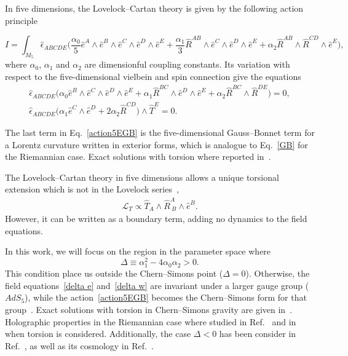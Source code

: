 \documentclass[aps,prd,12pt,superscriptaddress,showpacs,showkeys,longbibliography,reprint,nofootinbib]{revtex4-1}
\begin{document}
In five dimensions, the Lovelock--Cartan theory is given by the following action principle 
\begin{widetext}
  \begin{equation}
    \label{action5EGB}
    I = \int_{M_5} \hat{\epsilon}_{ABCDE} \Big(\frac{\alpha_0}{5}\hat{e}^A\wedge\hat{e}^B\wedge\hat{e}^C\wedge
    \hat{e}^D\wedge\hat{e}^E
    +\frac{\alpha_1}{3}\hat{R}^{AB}\wedge\hat{e}^C\wedge\hat{e}^D\wedge\hat{e}^E
    +\alpha_2\hat{R}^{AB}\wedge\hat{R}^{CD}
    \wedge\hat{e}^E\Big),
  \end{equation}
  where $\alpha_0$, $\alpha_1$ and $\alpha_2$ are dimensionful coupling constants. Its variation with respect to the five-dimensional vielbein and spin connection give the equations
  \begin{gather}
    \label{delta e}
    \hat{\epsilon}_{ABCDE}\Big(\alpha_0\hat{e}^B\wedge\hat{e}^C\wedge\hat{e}^D\wedge\hat{e}^E
    + \alpha_1\hat{R}^{BC}\wedge\hat{e}^D\wedge\hat{e}^E
    + \alpha_2\hat{R}^{BC}\wedge\hat{R}^{DE}\Big)=0,
    \\
    \label{delta w}
    \hat{\epsilon}_{ABCDE}\Big(\alpha_1\hat{e}^C\wedge\hat{e}^D+
    2\alpha_2\hat{R}^{CD}\Big)\wedge\hat{T}^E=0.
  \end{gather}
\end{widetext}

The last term in Eq.~\eqref{action5EGB} is the five-dimensional Gauss--Bonnet term for a Lorentz curvature written in exterior forms, which is analogue to Eq.~\eqref{GB} for the Riemannian case.
Exact solutions with torsion where reported in~\cite{Canfora:2007ux}.

The Lovelock--Cartan theory in five dimensions allows a unique torsional extension which is not in the Lovelock series~\cite{Mardones:1990qc},
\begin{align}
  \label{boundary}
  \mathcal{L}_{T} \propto \hat{T}_A\wedge \hat{R}^A_{\ B}\wedge\hat{e}^B.
\end{align}
However, it can be written as a boundary term, adding no dynamics to the field equations.

In this work, we will focus on the region in the parameter space where
\begin{equation}
  \label{delta}
  \Delta\equiv\alpha_1^2-4\alpha_0\alpha_2 > 0.
\end{equation}
This condition place us outside the Chern--Simons point ($\Delta =
0$). Otherwise, the field equations~\eqref{delta e} and~\eqref{delta
  w} are invariant under a larger gauge group ($AdS_5$), while the
action~\eqref{action5EGB} becomes the Chern--Simons form for that
group~\cite{Zanelli:2016cs,*Troncoso:1999pk}. Exact solutions with
torsion in Chern--Simons gravity are given
in~\cite{Aros:2007nn,Banados:2003cz}. Holographic properties in the
Riemannian case where studied in Ref.~\cite{Banados:2005rz} and in
\cite{Banados:2006fe} when torsion is considered. Additionally, the
case $\Delta < 0$ has been consider in Ref.~\cite{Canfora:2013xsa}, as
well as its cosmology in Ref.~\cite{Canfora:2014iga}.
\end{document}
